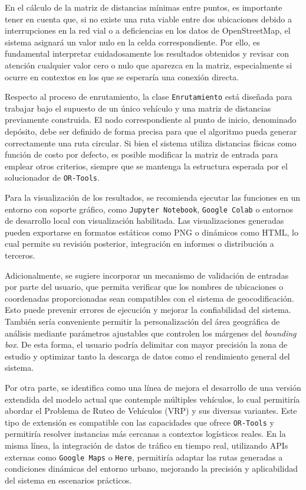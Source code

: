 \documentclass[a4paper,12pt]{article}
\begin{document}
En el cálculo de la matriz de distancias mínimas entre puntos, es importante tener en cuenta que, si no existe una ruta viable entre dos ubicaciones debido a interrupciones en la red vial o a deficiencias en los datos de OpenStreetMap, el sistema asignará un valor nulo en la celda correspondiente. Por ello, es fundamental interpretar cuidadosamente los resultados obtenidos y revisar con atención cualquier valor cero o nulo que aparezca en la matriz, especialmente si ocurre en contextos en los que se esperaría una conexión directa.

Respecto al proceso de enrutamiento, la clase \texttt{Enrutamiento} está diseñada para trabajar bajo el supuesto de un único vehículo y una matriz de distancias previamente construida. El nodo correspondiente al punto de inicio, denominado depósito, debe ser definido de forma precisa para que el algoritmo pueda generar correctamente una ruta circular. Si bien el sistema utiliza distancias físicas como función de costo por defecto, es posible modificar la matriz de entrada para emplear otros criterios, siempre que se mantenga la estructura esperada por el solucionador de \texttt{OR-Tools}.

Para la visualización de los resultados, se recomienda ejecutar las funciones en un entorno con soporte gráfico, como \texttt{Jupyter Notebook}, \texttt{Google Colab} o entornos de desarrollo local con visualización habilitada. Las visualizaciones generadas pueden exportarse en formatos estáticos como PNG o dinámicos como HTML, lo cual permite su revisión posterior, integración en informes o distribución a terceros.

Adicionalmente, se sugiere incorporar un mecanismo de validación de entradas por parte del usuario, que permita verificar que los nombres de ubicaciones o coordenadas proporcionadas sean compatibles con el sistema de geocodificación. Esto puede prevenir errores de ejecución y mejorar la confiabilidad del sistema. También sería conveniente permitir la personalización del área geográfica de análisis mediante parámetros ajustables que controlen los márgenes del \textit{bounding box}. De esta forma, el usuario podría delimitar con mayor precisión la zona de estudio y optimizar tanto la descarga de datos como el rendimiento general del sistema.

Por otra parte, se identifica como una línea de mejora el desarrollo de una versión extendida del modelo actual que contemple múltiples vehículos, lo cual permitiría abordar el Problema de Ruteo de Vehículos (VRP) y sus diversas variantes. Este tipo de extensión es compatible con las capacidades que ofrece \texttt{OR-Tools} y permitiría resolver instancias más cercanas a contextos logísticos reales. En la misma línea, la integración de datos de tráfico en tiempo real, utilizando APIs externas como \texttt{Google Maps} o \texttt{Here}, permitiría adaptar las rutas generadas a condiciones dinámicas del entorno urbano, mejorando la precisión y aplicabilidad del sistema en escenarios prácticos.







\newpage
 
  
\end{document}
